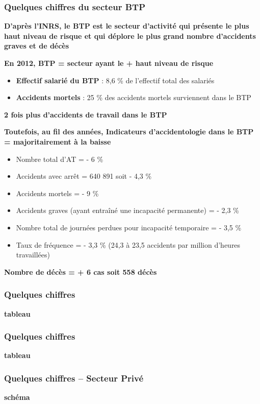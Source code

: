 \documentclass{beamer}
\begin{document}
\begin{frame}
\frametitle{Quelques chiffres du secteur BTP}

\textbf{D’après l’INRS, le BTP est le secteur d’activité qui présente le plus haut niveau de risque et qui déplore le plus grand nombre d’accidents graves et de décès}

\textbf{En 2012, BTP = secteur ayant le + haut niveau de risque}
\begin{itemize}
\item \textbf{Effectif salarié du BTP} : 8,6 \% de l’effectif total des salariés 
\item \textbf{Accidents mortels} : 25 \% des accidents mortels surviennent dans le BTP
\end{itemize}
\textbf{2 fois plus d’accidents de travail dans le BTP}

\textbf{Toutefois, au fil des années,  Indicateurs d’accidentologie dans le BTP = majoritairement à la baisse}
\begin{itemize}
\item Nombre total d’AT = - 6 \%
\item  Accidents avec arrêt = 640 891 soit - 4,3 \% 
\item  Accidents mortels = - 9 \%
\item  Accidents graves (ayant entraîné une incapacité permanente) = - 2,3 \%
\item  Nombre total de journées perdues pour incapacité temporaire = - 3,5 \%
\item  Taux de fréquence = - 3,3 \% (24,3 à 23,5 accidents par million d’heures travaillées)
\end{itemize}
\textbf{Nombre de décès = + 6 cas soit 558 décès }
\end{frame}

\begin{frame}
\frametitle{Quelques chiffres}

\textbf{tableau}
\end{frame}

\begin{frame}
\frametitle{Quelques chiffres}

\textbf{tableau}
\end{frame}

\begin{frame}
\frametitle{Quelques chiffres – Secteur Privé}

\textbf{schéma}
\end{frame}
\end{document}
